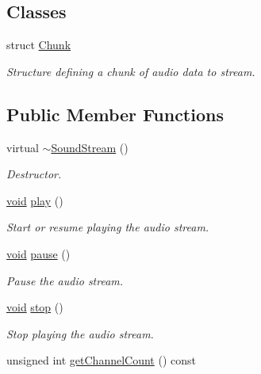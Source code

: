 \subsection*{Classes}
\begin{DoxyCompactItemize}
\item 
struct \hyperlink{structsf_1_1_sound_stream_1_1_chunk}{Chunk}
\begin{DoxyCompactList}\small\item\em Structure defining a chunk of audio data to stream. \end{DoxyCompactList}\end{DoxyCompactItemize}
\subsection*{Public Member Functions}
\begin{DoxyCompactItemize}
\item 
virtual \hyperlink{classsf_1_1_sound_stream_a1fafb9f1ca572d23d7d6a17921860d85}{$\sim$\-Sound\-Stream} ()
\begin{DoxyCompactList}\small\item\em Destructor. \end{DoxyCompactList}\item 
\hyperlink{glutf90_8h_ac778d6f63f1aaf8ebda0ce6ac821b56e}{void} \hyperlink{classsf_1_1_sound_stream_afdc08b69cab5f243d9324940a85a1144}{play} ()
\begin{DoxyCompactList}\small\item\em Start or resume playing the audio stream. \end{DoxyCompactList}\item 
\hyperlink{glutf90_8h_ac778d6f63f1aaf8ebda0ce6ac821b56e}{void} \hyperlink{classsf_1_1_sound_stream_a932ff181e661503cad288b4bb6fe45ca}{pause} ()
\begin{DoxyCompactList}\small\item\em Pause the audio stream. \end{DoxyCompactList}\item 
\hyperlink{glutf90_8h_ac778d6f63f1aaf8ebda0ce6ac821b56e}{void} \hyperlink{classsf_1_1_sound_stream_a16cc6a0404b32e42c4dce184bb94d0f4}{stop} ()
\begin{DoxyCompactList}\small\item\em Stop playing the audio stream. \end{DoxyCompactList}\item 
unsigned int \hyperlink{classsf_1_1_sound_stream_a68dedd0a2c26e6937c80fab3d235edea}{get\-Channel\-Count} () const 

\end{DoxyCompactItemize}
